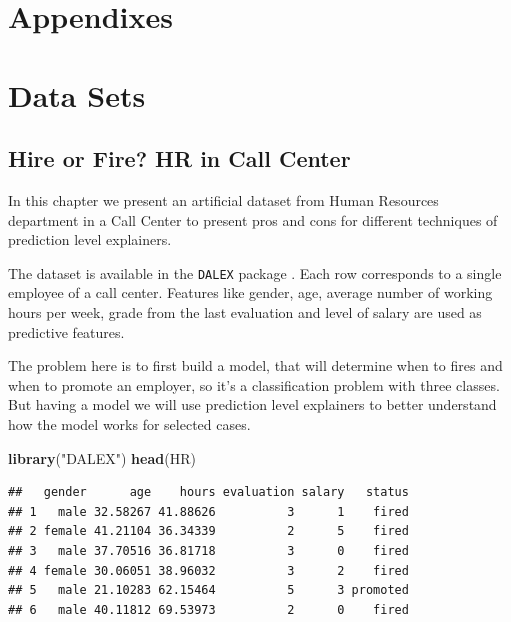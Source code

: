 \documentclass[]{book}
\newenvironment{Shaded}{\begin{snugshade}}{\end{snugshade}}
\newcommand{\KeywordTok}[1]{\textcolor[rgb]{0.13,0.29,0.53}{\textbf{#1}}}
\newcommand{\NormalTok}[1]{#1}
\newcommand{\StringTok}[1]{\textcolor[rgb]{0.31,0.60,0.02}{#1}}
\theoremstyle{definition}
\theoremstyle{definition}
\theoremstyle{definition}
\theoremstyle{remark}
\begin{document}
\hypertarget{appendixes}{%
\chapter*{Appendixes}\label{appendixes}}

\hypertarget{DataSets}{%
\chapter{Data Sets}\label{DataSets}}

\hypertarget{HRdataset}{%
\section{Hire or Fire? HR in Call Center}\label{HRdataset}}

In this chapter we present an artificial dataset from Human Resources
department in a Call Center to present pros and cons for different
techniques of prediction level explainers.

The dataset is available in the \texttt{DALEX} package \citep{R-DALEX}.
Each row corresponds to a single employee of a call center. Features
like gender, age, average number of working hours per week, grade from
the last evaluation and level of salary are used as predictive features.

The problem here is to first build a model, that will determine when to
fires and when to promote an employer, so it's a classification problem
with three classes. But having a model we will use prediction level
explainers to better understand how the model works for selected cases.

\begin{Shaded}
\begin{Highlighting}[]
\KeywordTok{library}\NormalTok{(}\StringTok{"DALEX"}\NormalTok{)}
\KeywordTok{head}\NormalTok{(HR)}
\end{Highlighting}
\end{Shaded}

\begin{verbatim}
##   gender      age    hours evaluation salary   status
## 1   male 32.58267 41.88626          3      1    fired
## 2 female 41.21104 36.34339          2      5    fired
## 3   male 37.70516 36.81718          3      0    fired
## 4 female 30.06051 38.96032          3      2    fired
## 5   male 21.10283 62.15464          5      3 promoted
## 6   male 40.11812 69.53973          2      0    fired
\end{verbatim}
\end{document}
